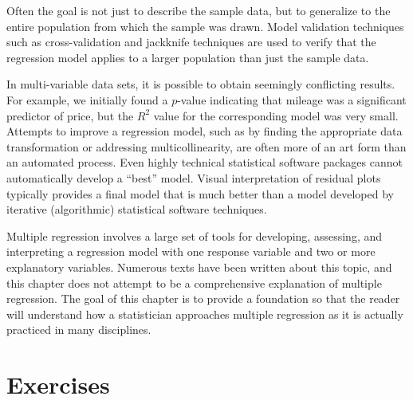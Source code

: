 \documentclass[
]{report}
\begin{document}
Often the goal is not just to describe the sample data, but to generalize to the entire population from which the sample was drawn. Model validation techniques such as cross-validation and jackknife techniques are used to verify that the regression model applies to a larger population than just the sample data.

In multi-variable data sets, it is possible to obtain seemingly conflicting results. For example, we initially
found a \(\scriptstyle p\)-value indicating that mileage was a significant predictor of price, but the \(\scriptstyle {R}^2\) value for the corresponding model was very small. Attempts to improve a regression model, such as by finding the appropriate data transformation or addressing multicollinearity, are often more of an art form than an automated process. Even highly technical statistical software packages cannot automatically develop a ``best'' model. Visual interpretation of residual plots typically provides a final model that is much better than a model developed by iterative (algorithmic) statistical software techniques.

Multiple regression involves a large set of tools for developing, assessing, and interpreting a regression model with one response variable and two or more explanatory variables. Numerous texts have been written about this topic, and this chapter does not attempt to be a comprehensive explanation of multiple regression. The goal of this chapter is to provide a foundation so that the reader will understand how a statistician approaches multiple regression as it is actually practiced in many disciplines.

\hypertarget{exercises-2}{%
\section{Exercises}\label{exercises-2}}
\end{document}
